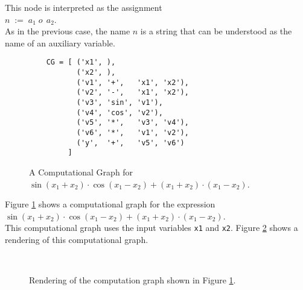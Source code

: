 \begin{Definition}
\begin{enumerate}
        This node is interpreted as the assignment
        \\[0.2cm]
        \hspace*{1.3cm}
        $n \;\mathtt{:=}\; a_1\; o\,\; a_2$.
        \\[0.2cm]
        As in the previous case, the name $n$ is a string that can be understood as the name of an auxiliary
        variable. 
        \eoxs
 \end{enumerate}
\end{Definition}

\begin{figure}[!ht]
\centering
\begin{verbatim}
    CG = [ ('x1', ),
           ('x2', ),
           ('v1', '+',   'x1', 'x2'),
           ('v2', '-',   'x1', 'x2'),
           ('v3', 'sin', 'v1'),
           ('v4', 'cos', 'v2'),
           ('v5', '*',   'v3', 'v4'),
           ('v6', '*',   'v1', 'v2'),
           ('y',  '+',   'v5', 'v6')
         ]
\end{verbatim}
\vspace*{-0.3cm}
\caption{A Computational Graph for $\sin(x_1 + x_2) \cdot \cos(x_1 - x_2) + (x_1 + x_2) \cdot (x_1 - x_2)$.}
\label{fig:computational-graph}
\end{figure}
\example
Figure \ref{fig:computational-graph} shows a computational graph for the expression
\\[0.2cm]
\hspace*{1.3cm}
$\sin(x_1 + x_2) \cdot \cos(x_1 - x_2) + (x_1 + x_2) \cdot (x_1 - x_2)$.
\\[0.2cm]
This computational graph uses the input variables \texttt{x1} and \texttt{x2}.
Figure \ref{fig:cg.eps} shows a rendering of this computational graph. \eoxs

\begin{figure}[!ht]
\centering
{} \
\vspace*{-0.3cm}
\caption{Rendering of the computation graph shown in Figure \ref{fig:computational-graph}.}
\label{fig:cg.eps}
\end{figure}

